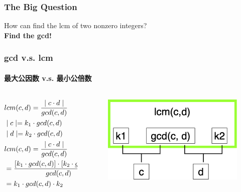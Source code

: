 \documentclass[
	11pt, %
]{beamer}
\begin{document}

\begin{frame}
	\frametitle{The Big Question}
	\bigskip
	{\LARGE How can find the lcm of two nonzero integers?}\\
	\bigskip
	\pause
	{\LARGE \alert{\textbf{Find the gcd!}}}
\end{frame}



\begin{frame}
	\frametitle{gcd v.s. lcm}
	\framesubtitle{最大公因数 v.s. 最小公倍数}

	
	\begin{columns}[c] %
		\begin{column}{0.6\textwidth} %

				\begin{equation*}
					\begin{split}
						&lcm(c, d) = \frac{\mid c \cdot d \mid}{gcd(c, d)} \\
						\bigskip
				    &\mid c \mid= k_1 \cdot gcd(c, d) \\
				    \bigskip
				    &\mid d \mid= k_2 \cdot gcd(c, d) \\
				    \bigskip
				    &lcm(c, d) = \frac{\mid c \cdot d \mid}{gcd(c, d)} \\
				              &= \frac{[k_1 \cdot gcd(c, d)] \cdot [k_2 \cdot gcd(c, d)] }{gcd(c, d)} \\
				              &= k_1 \cdot gcd(c, d) \cdot k_2
					\end{split}
				\end{equation*}

		\end{column}
		\begin{column}{0.4\textwidth} %
			\begin{figure}
				\includegraphics[width=\textwidth]{LCM.png}
			\end{figure}
		
		\end{column}
	\end{columns}
\end{frame}
\end{document}
